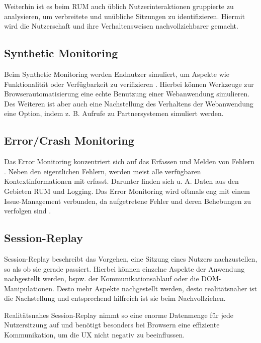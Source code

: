 Weiterhin ist es beim RUM auch üblich Nutzerinteraktionen gruppierte zu analysieren, um verbreitete und unübliche Sitzungen zu identifizieren. Hiermit wird die Nutzerschaft und ihre Verhaltensweisen nachvollziehbarer gemacht.

\subsection{Synthetic Monitoring}

Beim Synthetic Monitoring werden Endnutzer simuliert, um Aspekte wie Funktionalität oder Verfügbarkeit zu verifizieren \cite{IdentifyingWebPerformanceDegradations}. Hierbei können Werkzeuge zur Browserautomatisierung eine echte Benutzung einer Webanwendung simulieren. Des Weiteren ist aber auch eine Nachstellung des Verhaltens der Webanwendung eine Option, indem z. B. Aufrufe zu Partnersystemen simuliert werden.

\subsection{Error/Crash Monitoring}

Das Error Monitoring konzentriert sich auf das Erfassen und Melden von Fehlern \cite{CrashbinCrashMonitoring}. Neben den eigentlichen Fehlern, werden meist alle verfügbaren Kontextinformationen mit erfasst. Darunter finden sich u. A. Daten aus den Gebieten RUM und Logging. Das Error Monitoring wird oftmals eng mit einem Issue-Management verbunden, da aufgetretene Fehler und deren Behebungen zu verfolgen sind \cite{CrashbinCrashMonitoring}.

\subsection{Session-Replay}

Session-Replay beschreibt das Vorgehen, eine Sitzung eines Nutzers nachzustellen, so als ob sie gerade passiert. Hierbei können einzelne Aspekte der Anwendung nachgestellt werden, bspw. der Kommunikationsablauf oder die DOM-Manipulationen. Desto mehr Aspekte nachgestellt werden, desto realitätsnaher ist die Nachstellung und entsprechend hilfreich ist sie beim Nachvollziehen.

Realitätsnahes Session-Replay nimmt so eine enorme Datenmenge für jede Nutzersitzung auf und benötigt besonders bei Browsern eine effiziente Kommunikation, um die UX nicht negativ zu beeinflussen.

